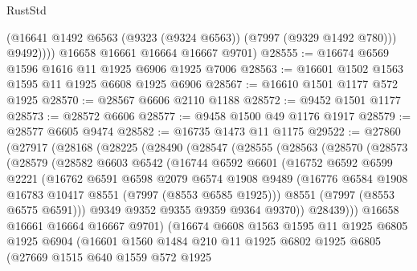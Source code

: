 \begin{lexlean}{RustStd}
\begin{coremodule}
{\begin{coremodule}
{{{{{{{{{{{{{{{{{{{{{{{{{{{{{{{{{{{{{{{{{{{              (@16641 @1492 @6563 (@9323 (@9324 @6563)) (@7997 (@9329 @1492 @780)))
              @9492))))
      @16658
      @16661
      @16664
      @16667
      @9701)
@28555 := @16674 @6569 @1596 @1616 @11 @1925 @6906 @1925 @7006
@28563 := @16601 @1502 @1563 @1595 @11 @1925 @6608 @1925 @6906
@28567 := @16610 @1501 @1177 @572 @1925
@28570 := @28567 @6606 @2110 @1188
@28572 := @9452 @1501 @1177
@28573 := @28572 @6606
@28577 := @9458 @1500 @49 @1176 @1917
@28579 := @28577 @6605 @9474
@28582 := @16735 @1473 @11 @1175
@29522 := @27860
    (@27917
      (@28168
        (@28225
          (@28490
            (@28547
              (@28555
                (@28563
                  (@28570
                    (@28573
                      (@28579
                        (@28582
                          @6603
                          @6542
                          (@16744
                            @6592
                            @6601
                            (@16752
                              @6592
                              @6599
                              @2221
                              (@16762
                                @6591
                                @6598
                                @2079
                                @6574
                                @1908
                                @9489
                                (@16776 @6584 @1908 @16783 @10417 @8551 (@7997 (@8553 @6585 @1925)))
                                @8551
                                (@7997 (@8553 @6575 @6591)))
                              @9349
                              @9352
                              @9355
                              @9359
                              @9364
                              @9370))
                          @28439)))
                    @16658
                    @16661
                    @16664
                    @16667
                    @9701)
                  (@16674
                    @6608
                    @1563
                    @1595
                    @11
                    @1925
                    @6805
                    @1925
                    @6904
                    (@16601
                      @1560
                      @1484
                      @210
                      @11
                      @1925
                      @6802
                      @1925
                      @6805
                      (@27669
                        @1515
                        @640
                        @1559
                        @572
                        @1925
}}}}}}}}}}}}}}}}}}}}}}}}}}}}}}}}}}}}}}}}}}}
\end{coremodule}}
\end{coremodule}
\end{lexlean}
